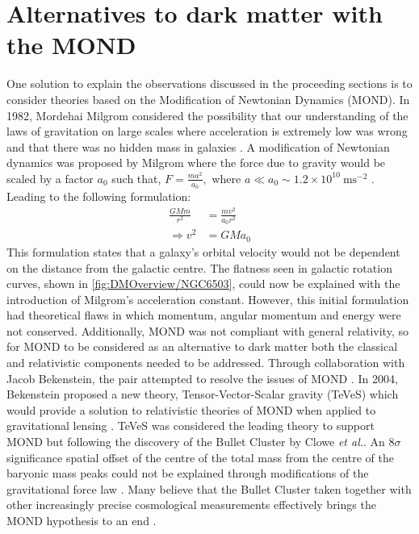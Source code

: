 \section{Alternatives to dark matter with the MOND}\label{sec:DMOverview/MOND}
One solution to explain the observations discussed in the proceeding sections is to consider theories based on the Modification of Newtonian Dynamics (MOND). In 1982, Mordehai Milgrom considered the possibility that our understanding of the laws of gravitation on large scales where acceleration is extremely low was wrong and that there was no hidden mass in galaxies \cite{MOND}. A modification of Newtonian dynamics was proposed by Milgrom where the force due to gravity would be scaled by a factor $a_0$ such that, $F=\frac{ma^2}{a_0},$ where $a\ll a_0\sim 1.2\times10^{10}~\text{ms}^{-2}$ \cite{HistoryofDM}. Leading to the following formulation:
\begin{equation}
\begin{split}
    \frac{GMm}{r^2}&=\frac{mv^2}{a_0r^2}\\
    \Rightarrow v^2&=GMa_0
\end{split}
\end{equation}
This formulation states that a galaxy's orbital velocity would not be dependent on the distance from the galactic centre. The flatness seen in galactic rotation curves, shown in \autoref{fig:DMOverview/NGC6503}, could now be explained with the introduction of Milgrom's acceleration constant. However, this initial formulation had theoretical flaws in which momentum, angular momentum and energy were not conserved. Additionally, MOND was not compliant with general relativity, so for MOND to be considered as an alternative to dark matter both the classical and relativistic components needed to be addressed.
Through collaboration with Jacob Bekenstein, the pair attempted to resolve the issues of MOND \cite{Bekenstein1984}. In 2004, Bekenstein proposed a new theory, Tensor-Vector-Scalar
gravity (TeVeS) which would provide a solution to relativistic theories of MOND when applied to gravitational lensing \cite{TeVeS}. TeVeS was considered the leading theory to support MOND but following the discovery of the Bullet Cluster by Clowe \textit{et al.}\cite{Clowe2006}. 
An $8\sigma$ significance spatial offset of the centre of the total mass from the centre of the baryonic mass peaks could not be explained through modifications of the gravitational force law \cite{Clowe2006}. Many believe that the Bullet Cluster taken together with other increasingly precise cosmological measurements effectively brings the MOND hypothesis to an end \cite{HistoryofDM}. 


